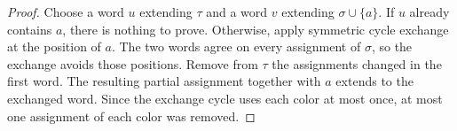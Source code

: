 \begin{proof}
Choose a word $u$ extending $\tau$ and a word $v$ extending
$\sigma\cup\{a\}$. If $u$ already contains $a$, there is nothing to prove.
Otherwise, apply symmetric cycle exchange at the position of $a$. The two
words agree on every assignment of $\sigma$, so the exchange avoids those
positions. Remove from $\tau$ the assignments changed in the first word.
The resulting partial assignment together with $a$ extends to the exchanged
word. Since the exchange cycle uses each color at most once, at most one
assignment of each color was removed.
\end{proof}
